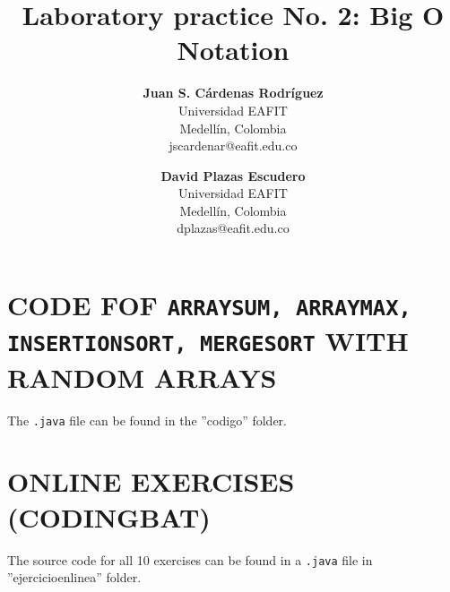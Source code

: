 \documentclass[a4paper,12pt]{article}
\title{\color{Eblue}\textbf{Laboratory practice No. 2: Big O Notation}}
\author{
  \textbf{Juan S. Cárdenas Rodríguez}\\
  Universidad EAFIT\\
  Medellín, Colombia\\
  jscardenar@eafit.edu.co
\and
  \textbf{David Plazas Escudero}\\
  Universidad EAFIT\\
  Medellín, Colombia\\
  dplazas@eafit.edu.co
}
\begin{document}
  \maketitle
  \thispagestyle{fancy}

  \section{CODE FOF \texttt{ARRAYSUM, ARRAYMAX, INSERTIONSORT, MERGESORT} WITH RANDOM ARRAYS}
    The \texttt{.java} file can be found in the ''codigo'' folder.
  \section{ONLINE EXERCISES (CODINGBAT)}
    The source code for all 10 exercises can be found in a \texttt{.java} file in ''ejercicioenlinea'' folder.
\end{document}
